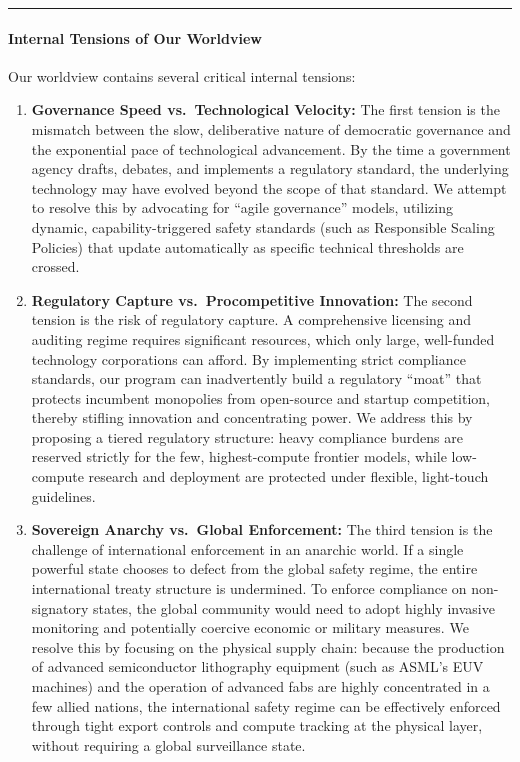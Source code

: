 \begin{center}\rule{0.5\linewidth}{0.5pt}\end{center}

\paragraph{Internal Tensions of Our
Worldview}\label{internal-tensions-of-our-worldview}

Our worldview contains several critical internal tensions:

\begin{enumerate}
\def\labelenumi{\arabic{enumi}.}
\item
  \textbf{Governance Speed vs.~Technological Velocity:} The first
  tension is the mismatch between the slow, deliberative nature of
  democratic governance and the exponential pace of technological
  advancement. By the time a government agency drafts, debates, and
  implements a regulatory standard, the underlying technology may have
  evolved beyond the scope of that standard. We attempt to resolve this
  by advocating for ``agile governance'' models, utilizing dynamic,
  capability-triggered safety standards (such as Responsible Scaling
  Policies) that update automatically as specific technical thresholds
  are crossed.
\item
  \textbf{Regulatory Capture vs.~Procompetitive Innovation:} The second
  tension is the risk of regulatory capture. A comprehensive licensing
  and auditing regime requires significant resources, which only large,
  well-funded technology corporations can afford. By implementing strict
  compliance standards, our program can inadvertently build a regulatory
  ``moat'' that protects incumbent monopolies from open-source and
  startup competition, thereby stifling innovation and concentrating
  power. We address this by proposing a tiered regulatory structure:
  heavy compliance burdens are reserved strictly for the few,
  highest-compute frontier models, while low-compute research and
  deployment are protected under flexible, light-touch guidelines.
\item
  \textbf{Sovereign Anarchy vs.~Global Enforcement:} The third tension
  is the challenge of international enforcement in an anarchic world. If
  a single powerful state chooses to defect from the global safety
  regime, the entire international treaty structure is undermined. To
  enforce compliance on non-signatory states, the global community would
  need to adopt highly invasive monitoring and potentially coercive
  economic or military measures. We resolve this by focusing on the
  physical supply chain: because the production of advanced
  semiconductor lithography equipment (such as ASML's EUV machines) and
  the operation of advanced fabs are highly concentrated in a few allied
  nations, the international safety regime can be effectively enforced
  through tight export controls and compute tracking at the physical
  layer, without requiring a global surveillance state.
\end{enumerate}

